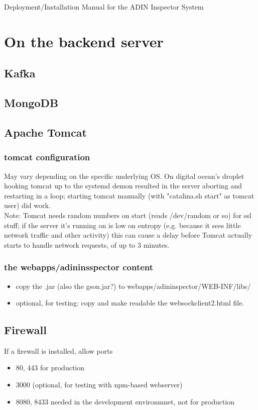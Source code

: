 \documentclass[oneside, english, final]{design}
\begin{document}
{\large Deployment/Installation Manual for the ADIN Inspector System}

\section{On the backend server}
\subsection{Kafka}
\subsection{MongoDB}

\subsection{Apache Tomcat}
\subsubsection{tomcat configuration}
May vary depending on the specific underlying OS.
On digital ocean's droplet hooking tomcat up to the systemd demon resulted in the server aborting and restarting in a loop; starting tomcat manually (with "catalina.sh start" as tomcat user) did work.
\\
Note: Tomcat needs random numbers on start (reads /dev/random or so) for ssl stuff; if the server it's running on is low on entropy (e.g. because it sees little network traffic and other activity) this can cause a delay before Tomcat actually starts to handle network requests, of up to 3 minutes.


\subsubsection{the webapps/adininsspector content}
\begin{itemize}
\item{copy the .jar (also the gson.jar?) to webapps/adininspector/WEB-INF/libs/}
\item{optional, for testing: copy and make readable the websockclient2.html file.}
\end{itemize}

\subsection{Firewall}
If a firewall is installed, allow ports
\begin{itemize}
\item{80, 443 for production} 
\item{3000 (optional, for testing with npm-based webserver)}
\item{8080, 8433 needed in the development environmnet, not for production}
\end{itemize}
\end{document}
